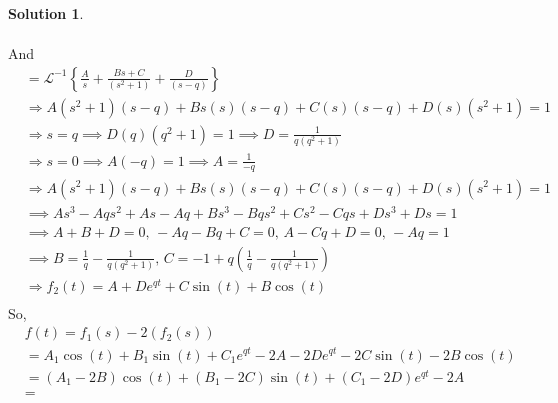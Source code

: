 \documentclass[10pt]{article}
\theoremstyle{definition}
\newtheorem{soln}{Solution}
\newcommand{\laplacei}[1]{\mathcal{L}^{-1}\left\{#1\right\}}
\begin{document}
\begin{soln}
\begin{enumerate}[label=(\alph*)]
\begin{align*}
          \end{align*}
          And
          \begin{align*}
             & =\laplacei{\frac{A}{s}+\frac{Bs+C}{\left(s^2+1\right)}+\frac{D}{\left(s-q\right)}}                                        \\
             & \Rightarrow A\left(s^2+1\right)\left(s-q\right) + Bs(s)\left(s-q\right) + C(s)\left(s-q\right) + D(s)\left(s^2+1\right)=1 \\
             & \Rightarrow s=q \implies D(q)\left(q^2+1\right)=1\implies D=\frac{1}{q\left(q^2+1\right)}                                 \\
             & \Rightarrow s=0 \implies A\left(-q\right)=1\implies A=\frac{1}{-q}                                                        \\
             & \Rightarrow A\left(s^2+1\right)\left(s-q\right) + Bs(s)\left(s-q\right) + C(s)\left(s-q\right) + D(s)\left(s^2+1\right)=1 \\
             & \implies As^3-Aqs^2+As-Aq + Bs^3-Bqs^2 + Cs^2-Cqs + Ds^3+Ds=1                                                             \\
             & \implies A+B+D=0, \, -Aq-Bq+C=0, \, A-Cq+D=0, \, -Aq=1                                                                    \\
             & \implies B=\frac{1}{q}-\frac{1}{q\left(q^2+1\right)}, \, C=-1+q\left(\frac{1}{q}-\frac{1}{q\left(q^2+1\right)}\right)     \\
             & \Rightarrow f_2(t)=A+De^{qt}+C\sin\left(t\right)+B\cos\left(t\right)                                                      \\
          \end{align*}
          So,
          \begin{align*}
             & f(t)=f_1(s)-2(f_2(s))                                                                                                                                                        \\
             & =A_1\cos\left(t\right)+B_1\sin\left(t\right)+C_1e^{qt} -2A-2De^{qt}-2C\sin\left(t\right)-2B\cos\left(t\right)                                                                \\
             & =\left(A_1-2B\right)\cos\left(t\right)+\left(B_1-2C\right)\sin\left(t\right)+\left(C_1-2D\right)e^{qt}-2A                                                                    \\
             & =

\end{align*}
\end{enumerate}
\end{soln}
\end{document}
